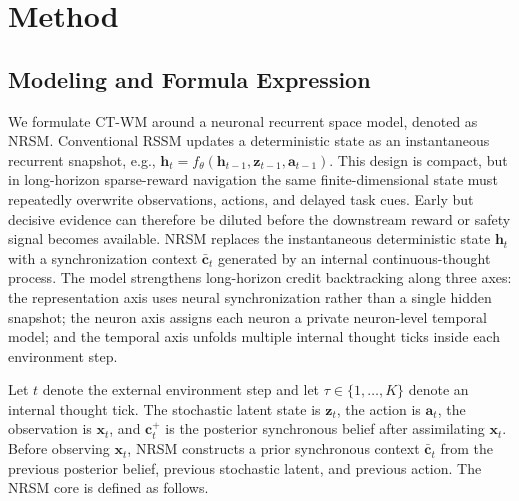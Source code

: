 \documentclass{article}
\begin{document}
\section{Method}

\subsection{Modeling and Formula Expression}

We formulate CT-WM around a neuronal recurrent space model, denoted as NRSM. Conventional RSSM updates a deterministic state as an instantaneous recurrent snapshot, e.g., $\mathbf h_t=f_\theta(\mathbf h_{t-1},\mathbf z_{t-1},\mathbf a_{t-1})$. This design is compact, but in long-horizon sparse-reward navigation the same finite-dimensional state must repeatedly overwrite observations, actions, and delayed task cues. Early but decisive evidence can therefore be diluted before the downstream reward or safety signal becomes available. NRSM replaces the instantaneous deterministic state $\mathbf h_t$ with a synchronization context $\bar{\mathbf c}_t$ generated by an internal continuous-thought process. The model strengthens long-horizon credit backtracking along three axes: the representation axis uses neural synchronization rather than a single hidden snapshot; the neuron axis assigns each neuron a private neuron-level temporal model; and the temporal axis unfolds multiple internal thought ticks inside each environment step.

Let $t$ denote the external environment step and let $\tau \in \{1,\ldots,K\}$ denote an internal thought tick. The stochastic latent state is $\mathbf z_t$, the action is $\mathbf a_t$, the observation is $\mathbf x_t$, and $\mathbf c_t^+$ is the posterior synchronous belief after assimilating $\mathbf x_t$. Before observing $\mathbf x_t$, NRSM constructs a prior synchronous context $\bar{\mathbf c}_t$ from the previous posterior belief, previous stochastic latent, and previous action. The NRSM core is defined as follows.
\end{document}
